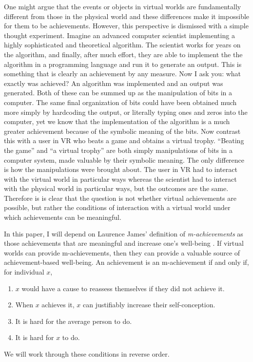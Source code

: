 One might argue that the events or objects in virtual worlds are fundamentally
different from those in the physical world and these differences make it
impossible for them to be achievements. However, this perspective is dismissed
with a simple thought experiment. Imagine an advanced computer scientist 
implementing a highly sophisticated and theoretical algorithm. The scientist
works for years on the algorithm, and finally, after much effort, they are able
to implement the the algorithm in a programming language and run it to generate
an output. This is something that is clearly an achievement by any measure. Now
I ask you: what exactly was achieved? An algorithm was implemented and an output
was generated. Both of these can be summed up as the manipulation of bits in a
computer. The same final organization of bits could have been obtained much more
simply by hardcoding the output, or literally typing ones and zeros into the 
computer, yet we know that the implementation of the algorithm is a much greater
achievement because of the symbolic meaning of the bits. Now contrast this with
a user in VR who beats a game and obtains a virtual trophy. ``Beating the
game'' and ``a virtual trophy'' are both simply manipulations of bits in a
computer system, made valuable by their symbolic meaning. The only difference is
how the manipulations were brought about. The user in VR had to interact with
the virtual world in particular ways whereas the scientist had to interact with
the physical world in particular ways, but the outcomes are the same. Therefore
is is clear that the question is not whether virtual achievements are possible,
but rather the conditions of interaction with a virtual world under which
achievements can be meaningful.

In this paper, I will depend on Laurence James' definition of
\emph{m-achievements} as those achievements that are meaningful and increase
one's well-being \citep{James2005}. If virtual worlds can provide m-achievements,
then they can provide a valuable source of achievement-based well-being. An
achievement is an m-achievement if and only if, for individual $x$,
\begin{enumerate}
    \item $x$ would have a cause to reassess themselves if they did not achieve
          it.
    \item When $x$ achieves it, $x$ can justifiably increase their
          self-conception.
    \item It is hard for the average person to do.
    \item It is hard for $x$ to do.
\end{enumerate}
We will work through these conditions in reverse order.

